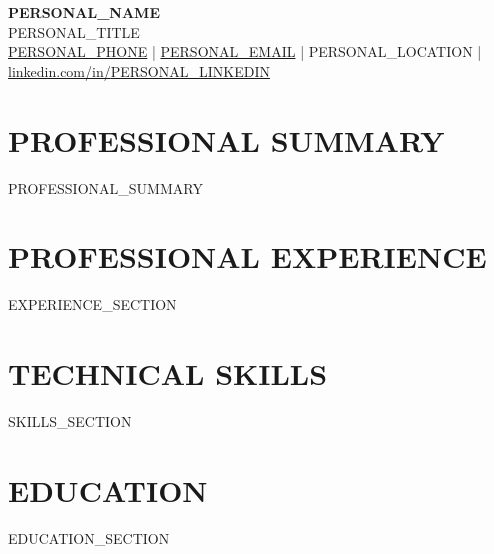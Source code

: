 \documentclass[10pt,letterpaper]{article}
\newcommand{\resumeheader}[6]{
  \begin{center}
    {\Huge\bfseries\color{headercolor} #1}\\[0.2em]
    {\Large\color{accentcolor} #2}\\[0.3em]
    \small
    \faPhone*{} \href{tel:#3}{#3} \quad|\quad
    \faEnvelope{} \href{mailto:#4}{#4} \quad|\quad
    \faMapMarker*{} #5 \quad|\quad
    \faLinkedin{} \href{https://linkedin.com/in/#6}{linkedin.com/in/#6}
  \end{center}
  \vspace{0.5em}
}
\begin{document}
\resumeheader
  {{{PERSONAL_NAME}}}
  {{{PERSONAL_TITLE}}}
  {{{PERSONAL_PHONE}}}
  {{{PERSONAL_EMAIL}}}
  {{{PERSONAL_LOCATION}}}
  {{{PERSONAL_LINKEDIN}}}

\section{PROFESSIONAL SUMMARY}
{{PROFESSIONAL_SUMMARY}}

\section{PROFESSIONAL EXPERIENCE}

{{EXPERIENCE_SECTION}}

\section{TECHNICAL SKILLS}
{{SKILLS_SECTION}}

\section{EDUCATION}
{{EDUCATION_SECTION}}
\end{document}
